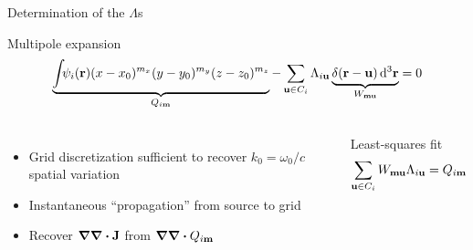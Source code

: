 \documentclass[aspectratio=169]{beamer}
\begin{document}
\begin{frame}{Determination of the $\Lambda$s}
  \begin{block}{Multipole expansion}
    \begin{equation*}
      \underbrace{\int_{} \psi_i(\vb{r}) (x - x_0)^{m_x} (y - y_0)^{m_y} (z - z_0)^{m_z}}_{Q_{i\vb{m}}} - \sum_{\vb{u} \in C_i} \Lambda_{i \vb{u}} \underbrace{\delta(\vb{r} - \vb{u}) \dd[3]{\vb{r}}}_{W_{\vb{m}\vb{u}}} = 0
    \end{equation*}
  \end{block}
  \begin{columns}
      \begin{itemize}
        \item Grid discretization sufficient to recover $k_0 = \omega_0/c$ spatial variation
        \item Instantaneous ``propagation'' from source to grid
        \item Recover $\grad \div \vb{J}$ from $\grad \div Q_{i\vb{m}}$
      \end{itemize}

      \begin{block}{Least-squares fit}
        \begin{equation*}
          \sum_{\vb{u} \in C_i} W_{\vb{m}\vb{u}} \Lambda_{i \vb{u}} = Q_{i\vb{m}}
        \end{equation*}
      \end{block}
  \end{columns}
\end{frame}
\end{document}
